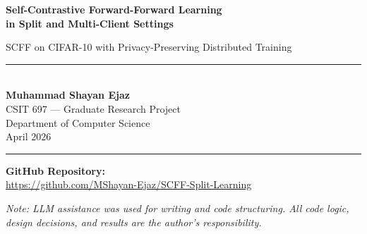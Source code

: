 \documentclass[12pt]{article}
\begin{document}
\begin{titlepage}
  \centering
  \vspace*{1.5cm}

  {\LARGE\bfseries Self-Contrastive Forward-Forward Learning\\[0.4em]
  in Split and Multi-Client Settings\par}

  \vspace{0.5cm}
  {\large SCFF on CIFAR-10 with Privacy-Preserving Distributed Training\par}

  \vspace{1.5cm}
  \rule{0.6\linewidth}{0.4pt}\\[0.8cm]

  {\large\textbf{Muhammad Shayan Ejaz}}\\[0.3cm]
  {\normalsize CSIT 697 --- Graduate Research Project}\\[0.1cm]
  {\normalsize Department of Computer Science}\\[0.5cm]
  {\normalsize April 2026}

  \vspace{1cm}
  \rule{0.6\linewidth}{0.4pt}

  \vspace{1.5cm}
  \textbf{GitHub Repository:}\\
  \url{https://github.com/MShayan-Ejaz/SCFF-Split-Learning}

  \vfill
  \small\textit{Note: LLM assistance was used for writing and code structuring.
  All code logic, design decisions, and results are the author's responsibility.}
\end{titlepage}

\begin{abstract}
This report describes an implementation of Self-supervised Contrastive Forward-Forward (SCFF)
learning in two split-learning configurations: a single-client/single-server setup and a
sequential multi-client relay. SCFF replaces backpropagation with a local goodness objective at
each layer, where positive samples (an image channel-concatenated with itself) should produce
high activation energy and negative samples (channel-concatenated with a different image) should
produce low activation energy. Because the loss is already layer-local, the physical split
boundary introduces no accuracy penalty --- the \texttt{.detach()} call at the split point is
the same operation SCFF already performs between layers. On CIFAR-10, the single-client split
configuration reaches 92.19\% training accuracy and 79.77\% test accuracy on the linear readout.
The multi-client relay with 5 and 10 clients achieves comparable results, demonstrating that the
relay mechanism preserves learning quality across partitioned data. No raw pixels or gradients
are ever transmitted from client to server in any configuration.
\end{abstract}
\end{document}
